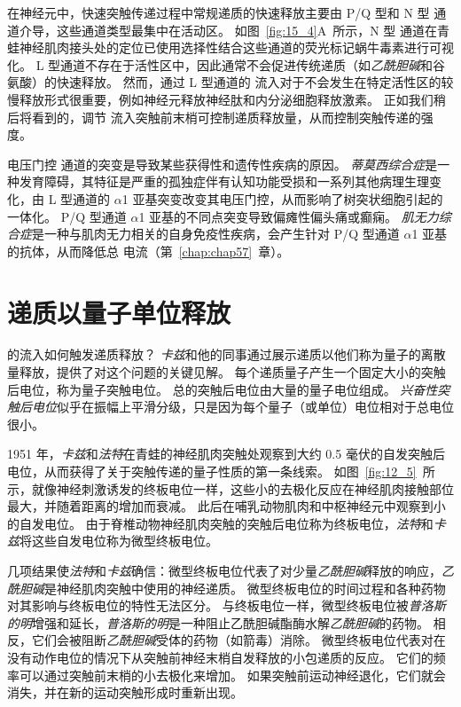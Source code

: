 在神经元中，快速突触传递过程中常规递质的快速释放主要由 P/Q 型和 N 型  通道介导，这些通道类型最集中在活动区。
如图~\ref{fig:15_4}A~所示，N 型  通道在青蛙神经肌肉接头处的定位已使用选择性结合这些通道的荧光标记蜗牛毒素进行可视化。
L 型通道不存在于活性区中，因此通常不会促进传统递质（如\textit{乙酰胆碱}和谷氨酸）的快速释放。
然而，通过 L 型通道的  流入对于不会发生在特定活性区的较慢释放形式很重要，例如神经元释放神经肽和内分泌细胞释放激素。
正如我们稍后将看到的，调节  流入突触前末梢可控制递质释放量，从而控制突触传递的强度。


电压门控  通道的突变是导致某些获得性和遗传性疾病的原因。
\textit{蒂莫西综合症}是一种发育障碍，其特征是严重的孤独症伴有认知功能受损和一系列其他病理生理变化，由 L 型通道的 $\alpha$1 亚基突变改变其电压门控，从而影响了树突状细胞引起的一体化。
P/Q 型通道 $\alpha$1 亚基的不同点突变导致偏瘫性偏头痛或癫痫。
\textit{肌无力综合症}是一种与肌肉无力相关的自身免疫性疾病，会产生针对 P/Q 型通道 $\alpha$1 亚基的抗体，从而降低总  电流（第~\ref{chap:chap57}~章）。



\section{递质以量子单位释放}

的流入如何触发递质释放？
\textit{卡兹}和他的同事通过展示递质以他们称为量子的离散量释放，提供了对这个问题的关键见解。
每个递质量子产生一个固定大小的突触后电位，称为量子突触电位。
总的突触后电位由大量的量子电位组成。
\textit{兴奋性突触后电位}似乎在振幅上平滑分级，只是因为每个量子（或单位）电位相对于总电位很小。


1951 年，\textit{卡兹}和\textit{法特}在青蛙的神经肌肉突触处观察到大约 0.5 毫伏的自发突触后电位，从而获得了关于突触传递的量子性质的第一条线索。
如图~\ref{fig:12_5}~所示，就像神经刺激诱发的终板电位一样，这些小的去极化反应在神经肌肉接触部位最大，并随着距离的增加而衰减。
此后在哺乳动物肌肉和中枢神经元中观察到小的自发电位。
由于脊椎动物神经肌肉突触的突触后电位称为终板电位，\textit{法特}和\textit{卡兹}将这些自发电位称为微型终板电位。


几项结果使\textit{法特}和\textit{卡兹}确信：微型终板电位代表了对少量\textit{乙酰胆碱}释放的响应，\textit{乙酰胆碱}是神经肌肉突触中使用的神经递质。
微型终板电位的时间过程和各种药物对其影响与终板电位的特性无法区分。
与终板电位一样，微型终板电位被\textit{普洛斯的明}增强和延长，\textit{普洛斯的明}是一种阻止乙酰胆碱酯酶水解\textit{乙酰胆碱}的药物。
相反，它们会被阻断\textit{乙酰胆碱}受体的药物（如箭毒）消除。 
微型终板电位代表对在没有动作电位的情况下从突触前神经末梢自发释放的小包递质的反应。
它们的频率可以通过突触前末梢的小去极化来增加。
如果突触前运动神经退化，它们就会消失，并在新的运动突触形成时重新出现。


